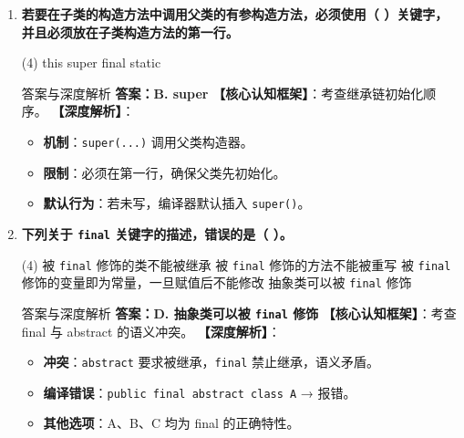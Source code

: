 ﻿\documentclass[12pt, a4paper]{ctexart}
\newcommand{\code}[1]{\texttt{#1}}
\begin{document}
\begin{enumerate}[label=\textbf{\arabic*.}, leftmargin=*, itemsep=1.5em]
	\item \textbf{若要在子类的构造方法中调用父类的有参构造方法，必须使用（ \quad ）关键字，并且必须放在子类构造方法的第一行。}
	      \begin{tasks}(4)
		      \task this \task super \task final \task static
	      \end{tasks}
	      \begin{bluebox}{答案与深度解析}
		      \textbf{答案：B. super}
		      \textbf{【核心认知框架】}：考查继承链初始化顺序。
		      \textbf{【深度解析】}：
		      \begin{itemize}[leftmargin=*, nosep]
			      \item \textbf{机制}：\code{super(...)} 调用父类构造器。
			      \item \textbf{限制}：必须在第一行，确保父类先初始化。
			      \item \textbf{默认行为}：若未写，编译器默认插入 \code{super()}。
		      \end{itemize}
	      \end{bluebox}

	\item \textbf{下列关于 \code{final} 关键字的描述，错误的是（ \quad ）。}
	      \begin{tasks}(4)
		      \task 被 \code{final} 修饰的类不能被继承
		      \task 被 \code{final} 修饰的方法不能被重写
		      \task 被 \code{final} 修饰的变量即为常量，一旦赋值后不能修改
		      \task 抽象类可以被 \code{final} 修饰
	      \end{tasks}
	      \begin{bluebox}{答案与深度解析}
		      \textbf{答案：D. 抽象类可以被 \code{final} 修饰}
		      \textbf{【核心认知框架】}：考查 final 与 abstract 的语义冲突。
		      \textbf{【深度解析】}：
		      \begin{itemize}[leftmargin=*, nosep]
			      \item \textbf{冲突}：\code{abstract} 要求被继承，\code{final} 禁止继承，语义矛盾。
			      \item \textbf{编译错误}：\code{public final abstract class A} → 报错。
			      \item \textbf{其他选项}：A、B、C 均为 final 的正确特性。
		      \end{itemize}
	      \end{bluebox}


\end{enumerate}
\end{document}

